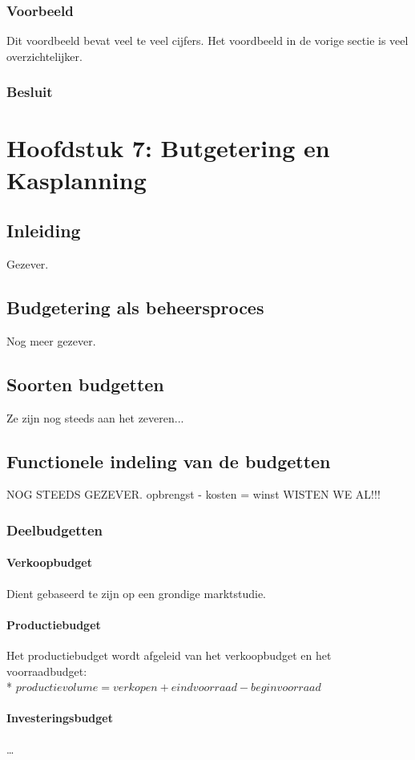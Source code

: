 \documentclass[12pt]{article}
\begin{document}
\subsubsection{Voorbeeld}
Dit voordbeeld bevat veel te veel cijfers. Het voordbeeld in de vorige sectie is veel overzichtelijker.
\subsubsection{Besluit}
\clearpage
\section{Hoofdstuk 7: Butgetering en Kasplanning}
\subsection{Inleiding}
Gezever.
\subsection{Budgetering als beheersproces}
Nog meer gezever.
\subsection{Soorten budgetten}
Ze zijn nog steeds aan het zeveren...
\subsection{Functionele indeling van de budgetten}
NOG STEEDS GEZEVER. opbrengst - kosten = winst WISTEN WE AL!!!
\subsubsection{Deelbudgetten}
\paragraph{Verkoopbudget}
Dient gebaseerd te zijn op een grondige marktstudie.
\paragraph{Productiebudget}
Het productiebudget wordt afgeleid van het verkoopbudget en het voorraadbudget:\\*
$productievolume = verkopen + eindvoorraad - beginvoorraad$
\paragraph{Investeringsbudget}
\dots
\end{document}
